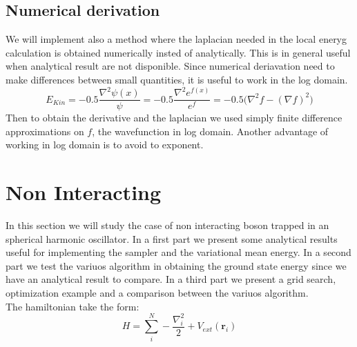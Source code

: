 \documentclass{article}
\begin{document}
\subsection{Numerical derivation}
We will implement also a method where the laplacian needed in the local eneryg calculation is obtained numerically insted of analytically. This is in general useful when analytical result are not disponible. Since numerical deriavation need to make differences between small quantities, it is useful to work in the log domain.
\begin{equation}
    E_{Kin} = -0.5\frac{\nabla^2 \psi(x)}{\psi} = -0.5\frac{\nabla^2 e^{f(x)}}{e^f} = -0.5\Big(\nabla^2f - (\nabla f)^2\Big)
\end{equation}
Then to obtain the derivative and the laplacian we used simply finite difference approximations on $f$, the wavefunction in log domain. Another advantage of working in log domain is to avoid to exponent.
\section{Non Interacting}
In this section we will study the case of non interacting boson trapped in an spherical harmonic oscillator. In a first part we present some analytical results useful for implementing the sampler and the variational mean energy. In a second part we test the variuos algorithm in obtaining the ground state energy since we have an analytical result to compare. In a third part we present a grid search, optimization example and a comparison between the variuos algorithm.\\

The hamiltonian take the form:
\begin{equation}
    H = \sum_i^N -\frac{\nabla^2_i}{2} + V_{ext}(\mathbf{r}_i)
\end{equation}
\end{document}
